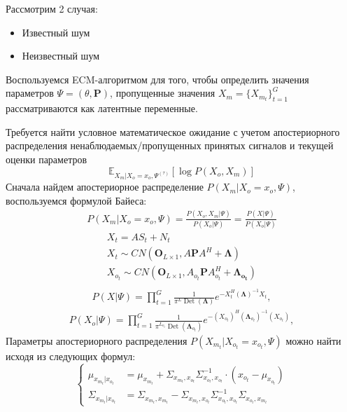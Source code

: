 \documentclass[11pt]{article}
\newcommand{\Expect}{\mathbb{E}}
\DeclareMathOperator{\Det}{Det}
\begin{document}
Рассмотрим 2 случая:
\begin{itemize}
\item
Известный шум
\item
Неизвестный шум
\end{itemize}
\begin{center}
\fontsize{16}{20}\selectfont {}
\end{center}
Воспользуемся ECM-алгоритмом для того, чтобы определить значения параметров $\Psi = (\theta, \mathbf{P})$, пропущенные значения $X_m=\{X_{m_t}\}_{t=1}^G$ рассматриваются как латентные переменные.
\begin{center}
\fontsize{14}{18}\selectfont {}
\end{center}
Требуется найти условное математическое ожидание с учетом апостериорного распределения ненаблюдаемых/пропущенных принятых сигналов и текущей оценки параметров
\begin{equation}
 \Expect_{X_m|X_o=x_o, \Psi^{(\tau)}}[\log P(X_o, X_m)]
\end{equation}
Сначала найдем апостериорное распределение $P(X_m|X_o=x_o,\Psi)$, воспользуемся формулой Байеса:
\begin{gather}
P(X_m|X_o=x_o,\Psi) = \frac{P(X_o, X_m|\Psi)}{P(X_o|\Psi)} = \frac{P(X|\Psi)}{P(X_o|\Psi)}
\end{gather}
\begin{gather*}
X_t = AS_t + N_t \\
X_t \sim CN(\mathbf{O}_{L \times 1}, A\mathbf{P}A^H + \mathbf{\Lambda})\\
X_{o_t} \sim CN(\mathbf{O}_{L \times 1}, A_{o_t}\mathbf{P}A_{o_t}^H + \mathbf{\Lambda_{o_t}})\\
\end{gather*}
\begin{gather}
P(X|\Psi) = \prod_{t=1}^G \frac{1}{\pi^L \Det(\mathbf{\Lambda})}e^{-X_t^H (\mathbf{\Lambda})^{-1}X_t},
\end{gather}
\begin{gather}
P(X_o|\Psi) = \prod_{t=1}^G \frac{1}{\pi^{L_{o_t}} \Det(\mathbf{\Lambda}_{o_t})}e^{-(X_{o_t})^H (\mathbf{\Lambda}_{o_t})^{-1}(X_{o_t})},
\end{gather}
Параметры апостериорного распределения $P(X_{m_t}|X_{o_t}=x_{o_t},\Psi)$ можно найти исходя из следующих формул:
\begin{equation}
\left\{ \begin{aligned} 
\mu_{x_{m_t}|x_{o_t}} &= \mu_{x_{m_t}} + \Sigma_{x_{m_t},x_{o_t}}\Sigma_{x_{o_t},x_{o_t}}^{-1}\cdot(x_{o_t}-\mu_{x_{o_t}}) \\
\Sigma_{x_{m_t}|x_{o_t}} &= \Sigma_{x_{m_t},x_{m_t}}-\Sigma_{x_{m_t},x_{o_t}}\Sigma_{x_{o_t},x_{o_t}}^{-1}\Sigma_{x_{o_t},x_{m_t}}
\end{aligned} \right.
\end{equation}
\end{document}
